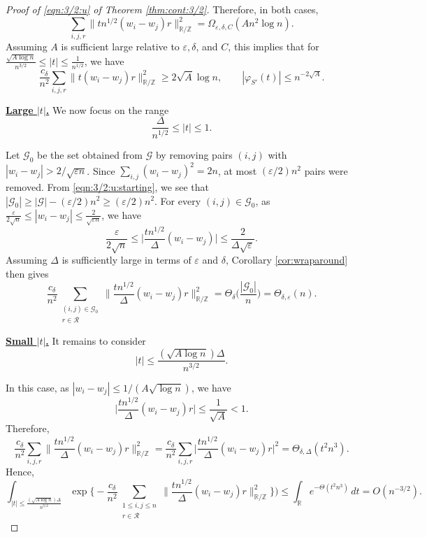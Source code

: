 \documentclass[reqno]{amsart}
\newcommand\R{{\mathbb{R}}}
\newcommand\Z{{\mathbb{Z}}}
\newcommand\eps{{\varepsilon}}
\newcommand\CG{{\mathcal G}}
\newcommand\CR{{\mathcal R}}
\theoremstyle{plain}
\theoremstyle{definition}
\begin{document}
\begin{proof}[Proof of \eqref{eqn:3/2:u} of Theorem \ref{thm:cont:3/2}]
Therefore, in both cases,
\[
\sum_{i,j,r} \|t n^{1/2} (w_{i}-w_{j})r\|_{\R/\Z}^{2} =\Omega_{\eps,\delta,C}(A n^{2} \log n).
\]
Assuming $A$ is sufficient large relative to $\eps,\delta$, and $C$, this implies that for $\frac{ \sqrt{A\log n}}{n^{3/2}} \le |t| \le \frac{1}{n^{1/2}}$, we have
\[
\frac{c_{\delta}}{n^{2}}\sum_{i,j,r} \| t (w_{i} - w_{j}) r \|_{\R/\Z}^{2} \ge 2\sqrt{A} \log n, \qquad |\varphi_{S'}(t)| \le n^{-2\sqrt{A}}.
\]


\underline{\bf Large $|t|$.} We now focus on the range 
$$\frac{\Delta}{n^{1/2}} \le |t|\le 1.$$  

Let $\CG_{0}$ be the set obtained from $\CG$ by removing pairs $(i,j)$ with $|w_{i} - w_{j}| > 2/\sqrt{\eps n}$. Since $\sum_{i,j}(w_{i}-w_{j})^2=2n$, at most $(\eps/2)n^2$ pairs were removed. From \eqref{eqn:3/2:u:starting}, we see that $|\CG_{0}|\ge |\CG|-(\eps/2)n^2\ge (\eps/2)n^2$. For every $(i,j)\in \CG_{0}$, as $\frac{\eps}{2\sqrt{n}} \le |w_{i} - w_{j}| \le \frac{2}{\sqrt{\eps n}}$, we have
\[
\frac{\eps}{2\sqrt{n}}\le \Big|\frac{t n^{1/2}}{\Delta} (w_{i}-w_{j})\Big|\le \frac{2}{\Delta \sqrt{\eps}}.
\]
Assuming $\Delta$ is sufficiently large in terms of $\eps$ and $\delta$, Corollary \ref{cor:wraparound} then gives
\[
\frac{c_{\delta}}{n^{2}}
\sum_{\substack{(i,j)\in \CG_{0}\\ r\in \CR}}
\Big\| \frac{t n^{1/2}}{\Delta} (w_i-w_j) r \Big\|_{\R/\Z}^{2}
= \Theta_{\delta}\!\Big(\frac{|\CG_{0}|}{n}\Big)
= \Theta_{\delta,\varepsilon}(n).
\]

\underline{\bf Small $|t|$.}  
It remains to consider 
$$|t| \le \frac{(\sqrt{A\log n})\Delta}{n^{3/2}}.$$

In this case, as $|w_{i}- w_{j}| \le 1/(A \sqrt{\log n})$, we have
\[
\Big|\frac{t n^{1/2}}{\Delta} (w_{i}-w_{j})r\Big|\le \frac{1}{\sqrt{A}}<1.
\]
Therefore,
\[
\frac{c_{\delta}}{n^{2}} \sum_{i,j,r} \Big\|\frac{t n^{1/2}}{\Delta} (w_{i}-w_{j})r\Big\|_{\R/\Z}^{2}
= \frac{c_{\delta}}{n^{2}} \sum_{i,j,r} \Big|\frac{t n^{1/2}}{\Delta}(w_{i}-w_{j})r\Big|^{2}
=\Theta_{\delta,\Delta}(t^{2} n^{3}).
\]
Hence,
\[
\int_{|t|\le \frac{(\sqrt{A\log n})\Delta}{n^{3/2}}} \exp\Big\{- \frac{c_{\delta}}{n^{2}} \sum_{\substack{1\le i,j \le n \\r \in \CR}} \Big\| \frac{t n^{1/2}}{\Delta} (w_{i}-w_{j}) r\Big\|_{\R/\Z}^{2}\Big\}\Big)
\le \int_{\R} e^{-\Theta(t^{2} n^{3})}\, dt
= O(n^{-3/2}).
\]
\end{proof}
\end{document}
